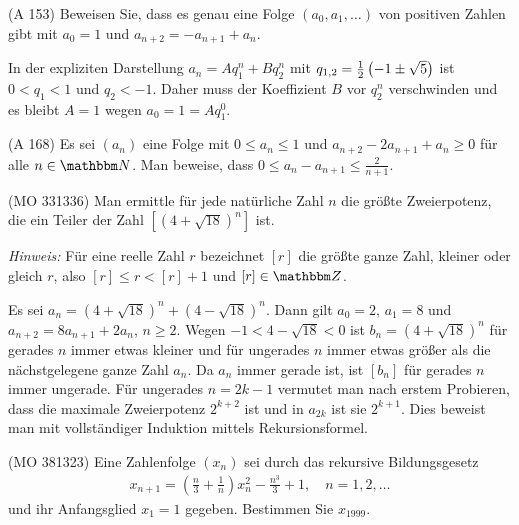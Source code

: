 \documentclass[11pt,a4paper]{article}
\begin{document}
\begin{aufgabe} (A 153) Beweisen Sie, dass es genau eine Folge 
$(a_0, a_1,\dots )$ von positiven Zahlen gibt mit $a_0=1$ und 
$a_{n+2}=-a_{n+1} +a_n$.
\end{aufgabe}

\begin{beweis} In der expliziten Darstellung $a_n=Aq_1^n  +B q_2 ^n$ mit 
$q_{1,2}=\frac{1}{2}\left(-1 \pm \sqrt{5}\right)$ ist $0< q_1 < 1$ und $q_2 <-1$.
  Daher muss der Koeffizient $B$ vor $q_2^n $ verschwinden und es bleibt $A=1$
  wegen $a_0=1=Aq_1^0$.
\end{beweis}

\begin{aufgabe} (A 168) Es  sei $(a_n)$ eine Folge mit $0\le a_n \le 1 $ und
$a_{n+2} -2a_{n+1} +a_n \ge 0$ für alle $n\in \N $. Man beweise, dass $0\le
  a_{n}-a_{n+1} \le \frac{2}{n+1}$.
\end{aufgabe}

\begin{aufgabe} (MO 331336) Man ermittle für jede natürliche Zahl $n$ die
größte Zweierpotenz, die ein Teiler  der Zahl $\left[(4+\sqrt{18})^n\right]$
ist.

\emph{Hinweis:} Für eine reelle Zahl $r$ bezeichnet $[r] $ die größte ganze
Zahl, kleiner oder gleich $r$, also $[r]\le r < [r] +1$ und $[r]\in \Z $.
\end{aufgabe}

\begin{loesung} Es sei $a_n=(4+\sqrt{18})^n + (4-\sqrt{18})^n$. Dann gilt
$a_0=2$, $a_1=8$ und $a_{n+2}= 8 a_{n+1} + 2 a_n$, $n\ge 2$. Wegen $ -1 <
  4-\sqrt{18} <0$ ist $b_n= (4+\sqrt{18})^n$ für gerades $n$ immer etwas
  kleiner und für ungerades $n$ immer etwas größer als die nächstgelegene ganze
  Zahl $a_n$. Da $a_n$ immer gerade ist, ist $[b_n]$ für gerades $n$ immer
  ungerade. Für ungerades $n =2k -1$ vermutet man nach erstem Probieren, dass
  die maximale Zweierpotenz $2^{k+2}$ ist und in $a_{2k} $ ist sie $2^{k+1}$.
  Dies beweist man mit vollständiger Induktion mittels Rekursionsformel.
\end{loesung}

\begin{aufgabe} (MO 381323)
Eine Zahlenfolge $(x_n)$ sei durch das rekursive Bildungsgesetz
\begin{gather*}
x_{n+1} = \left( \frac{n}{3} +\frac{1}{n}\right) x_n ^2 -\frac{n^3}{3} +1,
\quad n=1,2,\dots
\end{gather*}
und ihr Anfangsglied $x_1=1 $ gegeben. Bestimmen Sie $x_{1999} $.
\end{aufgabe}
\end{document}
